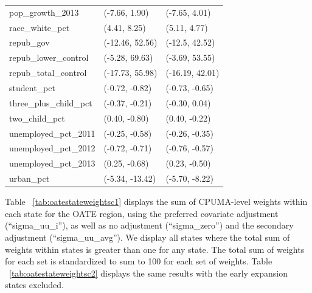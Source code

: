 \documentclass{article}
\begin{document}
\begin{appendix}
\begin{table}[ht]
\begin{tabular}{lll}
  pop\_growth\_2013 & (-7.66, 1.90) & (-7.65, 4.01) \\ 
  race\_white\_pct & (4.41, 8.25) & (5.11, 4.77) \\ 
  repub\_gov & (-12.46, 52.56) & (-12.5, 42.52) \\ 
  repub\_lower\_control & (-5.28, 69.63) & (-3.69, 53.55) \\ 
  repub\_total\_control & (-17.73, 55.98) & (-16.19, 42.01) \\ 
  student\_pct & (-0.72, -0.82) & (-0.73, -0.65) \\ 
  three\_plus\_child\_pct & (-0.37, -0.21) & (-0.30, 0.04) \\ 
  two\_child\_pct & (0.40, -0.80) & (0.40, -0.22) \\ 
  unemployed\_pct\_2011 & (-0.25, -0.58) & (-0.26, -0.35) \\ 
  unemployed\_pct\_2012 & (-0.72, -0.71) & (-0.76, -0.57) \\ 
  unemployed\_pct\_2013 & (0.25, -0.68) & (0.23, -0.50) \\ 
  urban\_pct & (-5.34, -13.42) & (-5.70, -8.22) \\ 
   \hline
\end{tabular}
\end{table}

Table ~\ref{tab:oatestateweightsc1} displays the sum of CPUMA-level weights within each state for the OATE region, using the preferred covariate adjustment (``sigma\_uu\_i''), as well as no adjustment (``sigma\_zero'') and the secondary adjustment (``sigma\_uu\_avg''). We display all states where the total sum of weights within states is greater than one for any state. The total sum of weights for each set is standardized to sum to 100 for each set of weights. Table ~\ref{tab:oatestateweightsc2} displays the same results with the early expansion states excluded.


\end{appendix}
\end{document}
